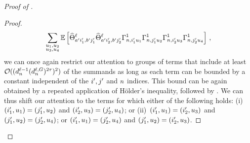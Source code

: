 \begin{proof}[Proof of ]
\begin{proof}
\begin{align*}
            \sum_{\substack{u_1 , u_2 \\ u_3 , u_4}}
                \operatorname*{\mathbb{E}} \left[
                    \widehat{\Theta}_{
                        a' i'_1 , b' j'_1
                    }^{\ell}
                    \widehat{\Theta}_{
                        a' i'_2 , b' j'_2
                    }^{\ell}
                    \Gamma_{n, i'_1 u_1}^{1}
                    \Gamma_{n, j'_1 u_2}^{1}
                    \Gamma_{n, i'_2 u_3}^{1}
                    \Gamma_{n, j'_2 u_4}^{1}
                \right]
            \, ,
        \end{align*}
        we can once again restrict our attention to groups of terms that include at least $\mathcal{O}((d_{n}^{\ell - 1} (d_{n}^{\ell, G})^{2\tau})^2)$ of the summands as long as each term can be bounded by a constant independent of the $i', j'$ and $n$ indices.
        This bound can be again obtained by a repeated application of H{\" o}lder's inequality, followed by .
        We can thus shift our attention to the terms for which either of the following holds: (i)~$(i'_1, u_1) = (j'_1, u_2)$ and $(i'_2, u_3) = (j'_2, u_4)$; or (ii)~$(i'_1, u_1) = (i'_2, u_3)$ and $(j'_1, u_2) = (j'_2, u_4)$; or $(i'_1, u_1) = (j'_2, u_4)$ and $(j'_1, u_2) = (i'_2, u_3)$.
        

\end{proof}
\end{proof}

